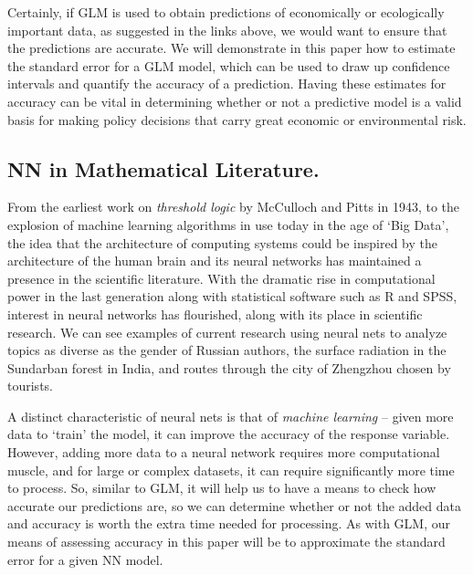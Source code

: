 \documentclass[12pt]{article}
\begin{document}
Certainly, if GLM is used to obtain predictions of economically or ecologically important data, as suggested in the links above, we would want to 
ensure that the predictions are accurate. We will demonstrate in this paper how to estimate the standard error for a GLM model, which can be 
used to draw up confidence intervals and quantify the accuracy of a prediction.  Having these estimates for accuracy can be vital in determining
whether or not a predictive model is a valid basis for making policy decisions that carry great economic or environmental risk.


	\subsection{NN in Mathematical Literature.}
		From the earliest work on \textit{threshold logic} by McCulloch and Pitts in 1943, to the explosion of machine learning algorithms
in use today in the age of `Big Data', the idea that the architecture of computing systems could be inspired by the architecture of the human brain
and its neural networks has maintained a presence in the scientific literature.  With the dramatic rise in computational power in the last 
generation along with statistical software such as R and SPSS, interest in neural networks has flourished, along with its place in scientific
research.  We can see examples of current research using neural nets to analyze topics as diverse as the gender of Russian authors, the surface
radiation in the Sundarban forest in India, and routes through the city of Zhengzhou chosen by tourists.
		
A distinct characteristic of neural nets is that of \textit{machine learning} -- given more data to `train' the model, it can improve the accuracy
of the response variable.  However, adding more data to a neural network requires more computational muscle, and for large or complex datasets,
it can require significantly more time to process.  So, similar to GLM, it will help us to have a means to check how accurate our predictions are,
so we can determine whether or not the added data and accuracy is worth the extra time needed for processing.  As with GLM, our means of assessing
accuracy in this paper will be to approximate the standard error for a given NN model.

\end{document}
